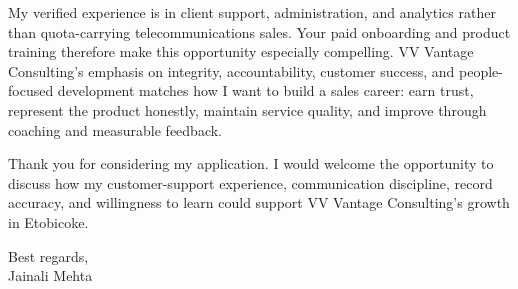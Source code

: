 \documentclass[letterpaper,11pt]{article}
\begin{document}
\bigbreak
My verified experience is in client support, administration, and analytics rather than quota-carrying telecommunications sales. Your paid onboarding and product training therefore make this opportunity especially compelling. VV Vantage Consulting's emphasis on integrity, accountability, customer success, and people-focused development matches how I want to build a sales career: earn trust, represent the product honestly, maintain service quality, and improve through coaching and measurable feedback.

\bigbreak
Thank you for considering my application. I would welcome the opportunity to discuss how my customer-support experience, communication discipline, record accuracy, and willingness to learn could support VV Vantage Consulting's growth in Etobicoke.

\bigbreak
Best regards,\\
Jainali Mehta
\end{document}
